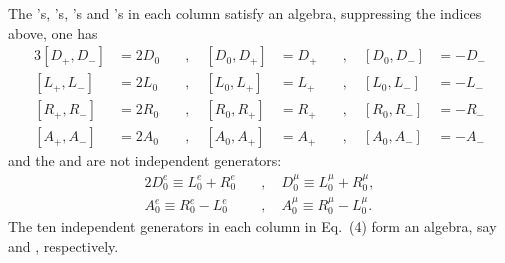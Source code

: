 \documentclass[a4paper,12pt]{article}
\begin{document}
The \coordHE{}'s, \coordHE{}'s, \coordHE{}'s and \coordHE{}'s in each column satisfy an \coordHE{} algebra, 
suppressing the \coordHE{} indices above, one has
\begin{alignat}{3}
[D_{+},D_{-}]&=2D_{0} & \quad, \quad [D_{0},D_{+}]&=D_{+} & \quad, \quad
[D_{0},D_{-}]&=-D_{-}  \\[0.2cm]
[L_{+},L_{-}]&=2L_{0} & \quad, \quad [L_{0},L_{+}]&=L_{+} & \quad, \quad 
[L_{0},L_{-}]&=-L_{-} \\[0.2cm]
[R_{+},R_{-}]&=2R_{0} & \quad, \quad [R_{0},R_{+}]&=R_{+} & \quad, \quad 
[R_{0},R_{-}]&=-R_{-}  \\[0.2cm]
[A_{+},A_{-}]&=2A_{0} & \quad, \quad [A_{0},A_{+}]&=A_{+} & \quad, \quad 
[A_{0},A_{-}]&=-A_{-}
\end{alignat}
and the \coordHE{} and \coordHE{} are not 
independent generators:
\begin{alignat}{2}
D_{0}^{e}\equiv L_{0}^{e}+R_{0}^{e} & \quad, \quad D_{0}^{\mu }\equiv L_{0}
^{\mu}+R_{0}^{\mu },\nonumber  \\[0.2cm] 
A_{0}^{e}\equiv R_{0}^{e}-L_{0}^{e} & \quad, \quad A_{0}^{\mu }
\equiv R_{0}^{\mu}-L_{0}^{\mu }.
\end{alignat}
The ten independent generators in each column in Eq.~(4) form an \coordHE{} 
algebra, 
say \coordHE{} and \coordHE{}, respectively.
\end{document}
